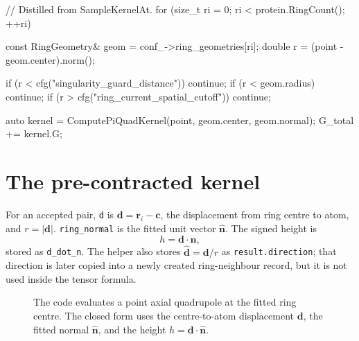 \documentclass[11pt]{article}
\newcommand{\code}[1]{\texttt{#1}}
\begin{document}
\begin{codebox}
// Distilled from SampleKernelAt.
for (size_t ri = 0; ri < protein.RingCount(); ++ri) {
    const RingGeometry& geom = conf_->ring_geometries[ri];
    double r = (point - geom.center).norm();

    if (r < cfg("singularity_guard_distance")) continue;
    if (r < geom.radius) continue;
    if (r > cfg("ring_current_spatial_cutoff")) continue;

    auto kernel = ComputePiQuadKernel(point, geom.center, geom.normal);
    G_total += kernel.G;
}
\end{codebox}

\section{The pre-contracted kernel}

For an accepted pair, \code{d} is
\(\bm d=\bm r_i-\bm c\), the displacement from ring centre to atom, and
\(r=|\bm d|\). \code{ring\_normal} is the fitted unit vector
\(\hat{\bm n}\). The signed height is
\[
  h = \bm d\cdot\hat{\bm n},
\]
stored as \code{d\_dot\_n}. The helper also stores
\(\hat{\bm d}=\bm d/r\) as \code{result.direction}; that direction is later
copied into a newly created ring-neighbour record, but it is not used inside
the tensor formula.

\begin{figure}[ht]
\centering
{}
\caption{The code evaluates a point axial quadrupole at the fitted ring centre.
The closed form uses the centre-to-atom displacement \(\bm d\), the fitted
normal \(\hat{\bm n}\), and the height \(h=\bm d\cdot\hat{\bm n}\).}
\end{figure}
\end{document}
